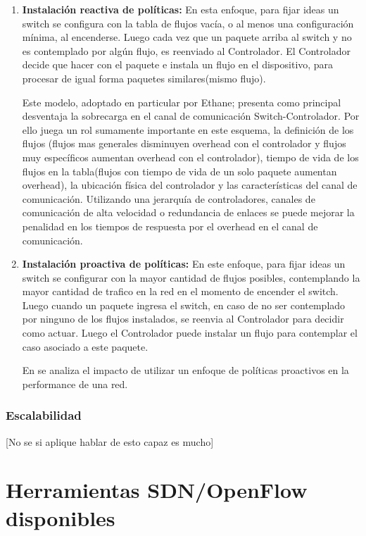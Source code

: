 \begin{enumerate}
\item \textbf{Instalación reactiva de políticas:} En esta enfoque, para fijar ideas un switch se configura con la tabla de flujos vac\'ia, o al menos una configuración mínima, al encenderse. Luego cada vez que un paquete arriba al switch y no es contemplado por algún flujo, es reenviado al Controlador. El Controlador decide que hacer con el paquete e instala un flujo en el dispositivo, para procesar de igual forma paquetes similares(mismo flujo).

Este modelo, adoptado en particular por Ethane\cite{casado2007ethane}; presenta como principal desventaja la sobrecarga en el canal de comunicación Switch-Controlador. Por ello juega un rol sumamente importante en este esquema, la definición de los flujos (flujos mas generales disminuyen overhead con el controlador y flujos muy específicos aumentan overhead con el controlador), tiempo de vida de los flujos en la tabla(flujos con tiempo de vida de un solo paquete aumentan overhead), la ubicación física del controlador y las características del canal de comunicación. Utilizando una jerarquía de controladores, canales de comunicación de alta velocidad o redundancia de enlaces se puede mejorar la penalidad en los tiempos de respuesta por el overhead en el canal de comunicación. 

\item \textbf{Instalación proactiva de políticas:} En este enfoque, para fijar ideas un switch se configurar con la mayor cantidad de flujos posibles, contemplando la mayor cantidad de trafico en la red en el momento de encender el switch. Luego cuando un paquete ingresa el switch, en caso de no ser contemplado por ninguno de los flujos instalados, se reenvia al Controlador para decidir como actuar. Luego el Controlador puede instalar un flujo para contemplar el caso asociado a este paquete. 

En \cite{yu2011scalable} se analiza el impacto de utilizar un enfoque de políticas proactivos en la performance de una red.  

\end{enumerate} 

\subsubsection{Escalabilidad}
[No se si aplique hablar de esto capaz es mucho]

\section{Herramientas SDN/OpenFlow disponibles}

